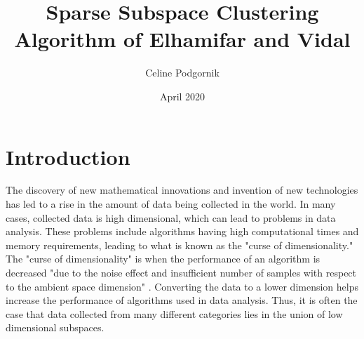 \documentclass{article}
\title{Sparse Subspace Clustering Algorithm of Elhamifar and Vidal}
\author{Celine Podgornik}
\date{April 2020}
\begin{document}
\maketitle

\section{Introduction}

\hspace{\parindent}The discovery of new mathematical innovations and invention of new technologies has led to a rise in the amount of data being collected in the world. In many cases, collected data is high dimensional, which can lead to problems in data analysis. These problems include algorithms having high computational times and memory requirements, leading to what is known as the "curse of dimensionality." The "curse of dimensionality" is when the performance of an algorithm is decreased "due to the noise effect and insufficient number of samples with respect to the ambient space dimension" \cite{elhamifar2012sparse}. Converting the data to a lower dimension helps increase the performance of algorithms used in data analysis. Thus, it is often the case that data collected from many different categories lies in the union of low dimensional subspaces. 
\end{document}
